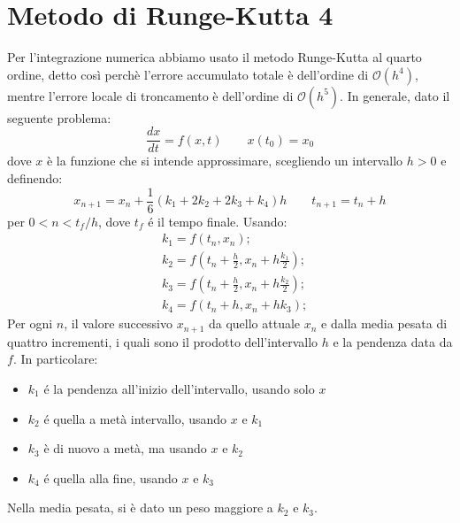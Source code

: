 \section{Metodo di Runge-Kutta 4}
Per l'integrazione numerica abbiamo usato il metodo Runge-Kutta al quarto ordine, detto così perchè l'errore accumulato totale è dell'ordine di $ \mathcal{O}(h^{4}) $, mentre l'errore locale di troncamento è dell'ordine di $ \mathcal{O}(h^{5}) $. 
In generale, dato il seguente problema:
\begin{equation} 
\frac{dx}{dt}=f(x,t)\qquad x(t_{0})=x_{0}
\end{equation}
dove $ x $ è la funzione che si intende approssimare, scegliendo un intervallo $ h>0 $ e definendo:
\begin{equation} 
	x_{n+1}=x_{n}+\frac{1}{6}(k_{1}+2k_{2}+2k_{3}+k_{4})h \qquad t_{n+1}=t_{n}+h
\end{equation}
per $ 0<n<t_{f}/h $, dove $ t_{f} $ é il tempo finale. Usando:
\begin{equation} 
	\begin{aligned}
	&k_{1}=f(t_{n}, x_{n});\\
	&k_{2}=f(t_{n}+\frac{h}{2}, x_{n}+h\frac{k_{1}}{2});\\
	&k_{3}=f(t_{n}+\frac{h}{2}, x_{n}+h\frac{k_{2}}{2});\\
	&k_{4}=f(t_{n}+h, x_{n}+hk_{3});
\end{aligned}
\end{equation}
Per ogni $ n $, il valore successivo $ x_{n+1} $ da quello attuale $ x_{n} $ e dalla media pesata di quattro incrementi, i quali sono il prodotto dell'intervallo $ h $ e la pendenza data da $ f $. In particolare:
\begin{itemize}
	\item $ k_{1} $ é la pendenza all'inizio dell'intervallo, usando solo $ x $ 
	\item $ k_{2} $ é quella a metà intervallo, usando $ x $ e $ k_{1} $
	\item $ k_{3} $ è di nuovo a metà, ma usando $ x $ e $ k_{2} $
	\item $ k_{4} $ é quella alla fine, usando $ x $ e $ k_{3} $
\end{itemize}
Nella media pesata, si è dato un peso maggiore a $ k_{2} $ e $ k_{3} $.
